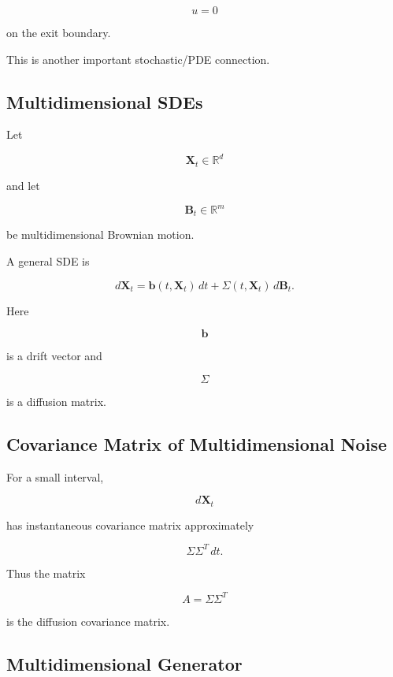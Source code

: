 \[
\boxed{
u=0
}
\]

on the exit boundary.

This is another important stochastic/PDE connection.

\subsection{Multidimensional SDEs}
\label{subsec:multidimensional-sdes}

Let

\[
\mathbf{X}_t
\in
\mathbb{R}^d
\]

and let

\[
\mathbf{B}_t
\in
\mathbb{R}^m
\]

be multidimensional Brownian motion.

A general SDE is

\[
\boxed{
d\mathbf{X}_t
=
\mathbf{b}(t,\mathbf{X}_t)\,dt
+
\Sigma(t,\mathbf{X}_t)\,d\mathbf{B}_t.
}
\]

Here

\[
\mathbf{b}
\]

is a drift vector and

\[
\Sigma
\]

is a diffusion matrix.

\subsection{Covariance Matrix of Multidimensional Noise}
\label{subsec:multidimensional-sde-covariance}

For a small interval,

\[
d\mathbf{X}_t
\]

has instantaneous covariance matrix approximately

\[
\boxed{
\Sigma\Sigma^T\,dt.
}
\]

Thus the matrix

\[
\boxed{
A
=
\Sigma\Sigma^T
}
\]

is the diffusion covariance matrix.

\subsection{Multidimensional Generator}
\label{subsec:multidimensional-generator-sde}


